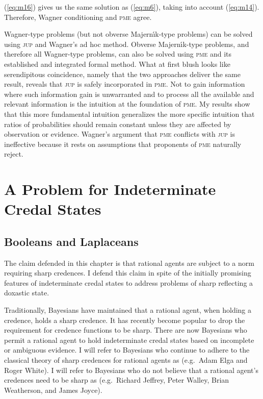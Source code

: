 \documentclass[phd,12pt,oneside]{ubcthesis}
\begin{document}
{\noindent}(\ref{eq:m16}) gives us the same solution as (\ref{eq:m6}),
taking into account (\ref{eq:m14}). Therefore, Wagner conditioning and
\textsc{pme} agree.

Wagner-type problems (but not obverse Majern{\'\i}k-type problems) can
be solved using \textsc{jup} and Wagner's ad hoc method. Obverse
Majern{\'\i}k-type problems, and therefore all Wagner-type problems,
can also be solved using \textsc{pme} and its established and
integrated formal method. What at first blush looks like serendipitous
coincidence, namely that the two approaches deliver the same result,
reveals that \textsc{jup} is safely incorporated in \textsc{pme}. Not
to gain information where such information gain is unwarranted and to
process all the available and relevant information is the intuition at
the foundation of \textsc{pme}. My results show that this more
fundamental intuition generalizes the more specific intuition that
ratios of probabilities should remain constant unless they are
affected by observation or evidence. Wagner's argument that
\textsc{pme} conflicts with \textsc{jup} is ineffective because it
rests on assumptions that proponents of \textsc{pme} naturally reject.

\chapter{A Problem for Indeterminate Credal States}
\label{chp:eingeili}

\section{Booleans and Laplaceans}
\label{sec:chiegaen}

The claim defended in this chapter is that rational agents are subject
to a norm requiring sharp credences. I defend this claim in spite of
the initially promising features of indeterminate credal states to
address problems of sharp reflecting a doxastic state.

Traditionally, Bayesians have maintained that a rational agent, when
holding a credence, holds a sharp credence. It has recently become
popular to drop the requirement for credence functions to be sharp.
There are now Bayesians who permit a rational agent to hold
indeterminate credal states based on incomplete or ambiguous evidence.
I will refer to Bayesians who continue to adhere to the classical
theory of sharp credences for rational agents as 
(e.g.\ Adam Elga and Roger White). I will refer to Bayesians who do
not believe that a rational agent's credences need to be sharp as
 (e.g.\ Richard Jeffrey, Peter Walley, Brian
Weatherson, and James Joyce).
\end{document}

